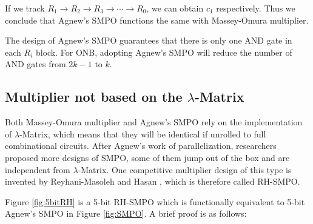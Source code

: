\begin{Example}
If we track $R_1\to R_2\to R_3 \to \cdots \to R_0$, we can obtain $c_1$ respectively.
Thus we conclude that Agnew's SMPO functions the same with Massey-Omura multiplier.
\end{Example}

The design of Agnew's SMPO guarantees that there is only one AND gate in each $R_i$ block.
For ONB, adopting Agnew's SMPO will reduce the number of AND gates from $2k-1$ to $k$.

\subsection{Multiplier not based on the $\lambda$-Matrix}
Both Massey-Omura multiplier and Agnew's SMPO rely on the implementation of $\lambda$-Matrix,
which means that they will be identical if unrolled to full combinational circuits. 
After Agnew's work of parallelization, researchers proposed more designs of SMPO, 
some of them jump out of the box and are independent from $\lambda$-Matrix.
One competitive multiplier design of this type is invented by Reyhani-Masoleh and Hasan 
\cite{RHmulti}, which is therefore called RH-SMPO.

\begin{figure}[H]
\end{figure}

Figure \ref{fig:5bitRH} is a 5-bit RH-SMPO which is functionally equivalent to 5-bit Agnew's SMPO 
in Figure \ref{fig:SMPO}. A brief proof is as follows: 


